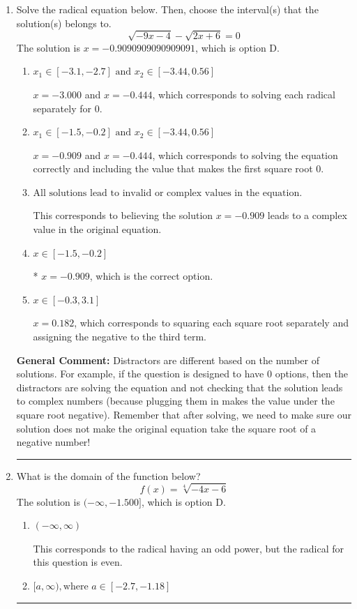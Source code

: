 \documentclass{extbook}[14pt]
\newcommand{\litem}[1]{\item #1

\rule{\textwidth}{0.4pt}}
\begin{document}
\begin{enumerate}\litem{
Solve the radical equation below. Then, choose the interval(s) that the solution(s) belongs to.
\[ \sqrt{-9 x - 4} - \sqrt{2 x + 6} = 0 \]The solution is \( x = -0.9090909090909091 \), which is option D.\begin{enumerate}[label=\Alph*.]
\item \( x_1 \in [-3.1, -2.7] \text{ and } x_2 \in [-3.44,0.56] \)

$x = -3.000$ and $x = -0.444$, which corresponds to solving each radical separately for 0.
\item \( x_1 \in [-1.5, -0.2] \text{ and } x_2 \in [-3.44,0.56] \)

$x = -0.909$ and $x = -0.444$, which corresponds to solving the equation correctly and including the value that makes the first square root 0.
\item \( \text{All solutions lead to invalid or complex values in the equation.} \)

This corresponds to believing the solution $x = -0.909$ leads to a complex value in the original equation.
\item \( x \in [-1.5,-0.2] \)

* $x = -0.909$, which is the correct option.
\item \( x \in [-0.3,3.1] \)

$x = 0.182$, which corresponds to squaring each square root separately and assigning the negative to the third term.
\end{enumerate}

\textbf{General Comment:} Distractors are different based on the number of solutions. For example, if the question is designed to have 0 options, then the distractors are solving the equation and not checking that the solution leads to complex numbers (because plugging them in makes the value under the square root negative). Remember that after solving, we need to make sure our solution does not make the original equation take the square root of a negative number!
}
\litem{
What is the domain of the function below?
\[ f(x) = \sqrt[4]{-4 x - 6} \]The solution is \( (-\infty, -1.500] \), which is option D.\begin{enumerate}[label=\Alph*.]
\item \( (-\infty, \infty) \)

This corresponds to the radical having an odd power, but the radical for this question is even.
\item \( [a, \infty), \text{where } a \in [-2.7, -1.18] \)


\end{enumerate}}
\end{enumerate}
\end{document}
